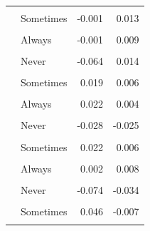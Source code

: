 \begin{longtable}[t]{>{\raggedright\arraybackslash}p{5cm}>{\raggedright\arraybackslash}p{5.5cm}rr}
\cellcolor{gray!6}{} & \cellcolor{gray!6}{Rarely} & \cellcolor{gray!6}{0.000} & \cellcolor{gray!6}{0.006}\\
 & Sometimes & -0.001 & 0.013\\
\cellcolor{gray!6}{} & \cellcolor{gray!6}{Most of the time} & \cellcolor{gray!6}{0.000} & \cellcolor{gray!6}{0.008}\\
\addlinespace
 & Always & -0.001 & 0.009\\
\cellcolor{gray!6}{Tobacco ads exposure: Retail stores} & \cellcolor{gray!6}{Never go to a convenience store/etc.} & \cellcolor{gray!6}{0.002} & \cellcolor{gray!6}{0.003}\\
 & Never & -0.064 & 0.014\\
\cellcolor{gray!6}{} & \cellcolor{gray!6}{Rarely} & \cellcolor{gray!6}{-0.015} & \cellcolor{gray!6}{-0.026}\\
 & Sometimes & 0.019 & 0.006\\
\addlinespace
\cellcolor{gray!6}{} & \cellcolor{gray!6}{Most of the time} & \cellcolor{gray!6}{0.036} & \cellcolor{gray!6}{-0.002}\\
 & Always & 0.022 & 0.004\\
\cellcolor{gray!6}{Tobacco ads exposure: TV/Streaming/Movies} & \cellcolor{gray!6}{Do not watch TV/streaming or movies} & \cellcolor{gray!6}{0.006} & \cellcolor{gray!6}{-0.006}\\
 & Never & -0.028 & -0.025\\
\cellcolor{gray!6}{} & \cellcolor{gray!6}{Rarely} & \cellcolor{gray!6}{-0.013} & \cellcolor{gray!6}{0.007}\\
\addlinespace
 & Sometimes & 0.022 & 0.006\\
\cellcolor{gray!6}{} & \cellcolor{gray!6}{Most of the time} & \cellcolor{gray!6}{0.012} & \cellcolor{gray!6}{0.010}\\
 & Always & 0.002 & 0.008\\
\cellcolor{gray!6}{E-cig ads exposure: Internet} & \cellcolor{gray!6}{I do not use the Internet} & \cellcolor{gray!6}{-0.002} & \cellcolor{gray!6}{-0.001}\\
 & Never & -0.074 & -0.034\\
\addlinespace
\cellcolor{gray!6}{} & \cellcolor{gray!6}{Rarely} & \cellcolor{gray!6}{0.011} & \cellcolor{gray!6}{0.012}\\
 & Sometimes & 0.046 & -0.007\\
\cellcolor{gray!6}{} & \cellcolor{gray!6}{Most of the time} & \cellcolor{gray!6}{0.020} & \cellcolor{gray!6}{0.002}\\

\end{longtable}
